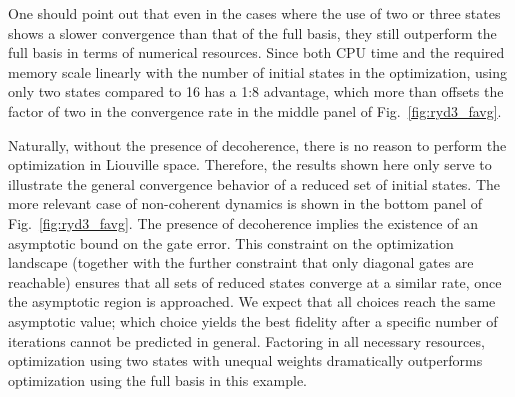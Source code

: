 One should point out that even in the cases where the use of two or three states
shows a slower convergence than that of the full basis, they still outperform
the full basis in terms of numerical resources. Since both CPU time and the
required memory scale linearly with the number of initial states in the
optimization, using only two states compared to 16 has a 1:8 advantage, which
more than offsets the factor of two in the convergence rate in the
middle panel of Fig.~\ref{fig:ryd3_favg}.

Naturally, without the presence of decoherence, there is no reason to perform
the optimization in Liouville space. Therefore, the results shown here only
serve to illustrate the general convergence behavior of a reduced set of initial
states. The more relevant case of non-coherent dynamics is shown in the bottom
panel of Fig.~\ref{fig:ryd3_favg}. The presence of decoherence implies the
existence of an asymptotic bound on the gate error. This
constraint on the optimization landscape (together with the further constraint
that only diagonal gates are reachable) ensures that all sets of reduced states
converge at a similar rate, once the asymptotic region is approached. We expect
that all choices reach the same asymptotic value; which choice yields the best
fidelity after a specific number of iterations cannot be predicted in general.
Factoring in all necessary resources, optimization using two states with unequal
weights dramatically outperforms optimization
using the full basis in this example.

